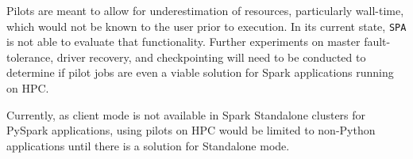     Pilots are meant to allow for underestimation of resources, particularly
    wall-time, which would not be known to the user prior to execution. In its
    current state, \texttt{SPA} is not able to evaluate that functionality.
    Further experiments on master fault-tolerance, driver recovery, and
    checkpointing will need to be conducted to determine if pilot jobs are even
    a viable solution for Spark applications running on HPC.
    
    Currently, as client mode is not available in Spark Standalone clusters for
    PySpark applications, using pilots on HPC would be limited to non-Python
    applications until there is a solution for Standalone mode.